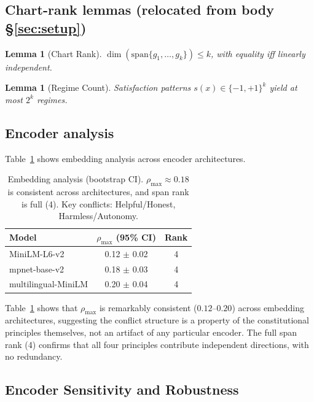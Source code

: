 \documentclass{article}
\theoremstyle{plain}
\newtheorem{lemma}[theorem]{Lemma}
\theoremstyle{definition}
\theoremstyle{remark}
\begin{document}
\subsection{Chart-rank lemmas (relocated from body \S\ref{sec:setup})}

\begin{lemma}[Chart Rank]\label{lem:chart_rank}
$\dim(\mathrm{span}\{g_1,\ldots,g_k\}) \le k$, with equality iff linearly independent.
\end{lemma}

\begin{lemma}[Regime Count]\label{lem:regime_count}
Satisfaction patterns $s(x) \in \{-1,+1\}^k$ yield at most $2^k$ regimes.
\end{lemma}

\subsection{Encoder analysis}

Table~\ref{tab:embedding_R} shows embedding analysis across encoder architectures.

\begin{table}[ht]
\centering
\small
\caption{Embedding analysis (bootstrap CI). $\rho_{\max} \approx 0.18$ is consistent across architectures, and span rank is full (4). Key conflicts: Helpful/Honest, Harmless/Autonomy.}
\label{tab:embedding_R}
\begin{tabular}{lcc}
\toprule
Model & $\rho_{\max}$ (95\% CI) & Rank \\
\midrule
MiniLM-L6-v2 & 0.12 $\pm$ 0.02 & 4 \\
mpnet-base-v2 & 0.18 $\pm$ 0.03 & 4 \\
multilingual-MiniLM & 0.20 $\pm$ 0.04 & 4 \\
\bottomrule
\end{tabular}
\end{table}

Table~\ref{tab:embedding_R} shows that $\rho_{\max}$ is remarkably consistent ($0.12$--$0.20$) across embedding architectures, suggesting the conflict structure is a property of the constitutional principles themselves, not an artifact of any particular encoder. The full span rank (4) confirms that all four principles contribute independent directions, with no redundancy.

\subsection{Encoder Sensitivity and Robustness}\label{app:encoder_robustness}\hypertarget{lim:assumptions}{}
\end{document}
